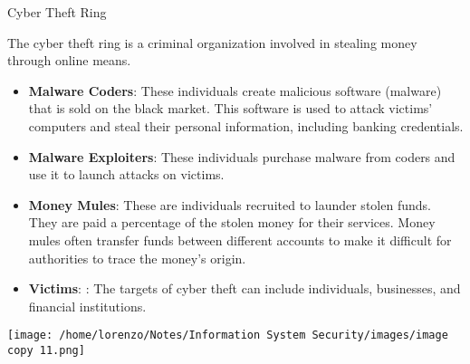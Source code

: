 \begin{quotebox}[colframe=blue!10!white, colback=blue!5!white]{Cyber Theft Ring}
\begin{minipage}{0.5\textwidth}
The cyber theft ring is a criminal organization involved in stealing money through online means. 
\begin{itemize}
    \item \textbf{Malware Coders}: These individuals create malicious software (malware) that is sold on the black market. This software is used to attack victims' computers and steal their personal information, including banking credentials.
    \item \textbf{Malware Exploiters}: These individuals purchase malware from coders and use it to launch attacks on victims.
    \item \textbf{Money Mules}: These are individuals recruited to launder stolen funds. They are paid a percentage of the stolen money for their services. Money mules often transfer funds between different accounts to make it difficult for authorities to trace the money's origin.   
    \item \textbf{Victims}: : The targets of cyber theft can include individuals, businesses, and financial institutions.
\end{itemize} 
\end{minipage} 
\hspace{0.2cm}
\begin{minipage}{0.4\textwidth}
    \centering
    \texttt{[image: /home/lorenzo/Notes/Information System Security/images/image copy 11.png]}
\end{minipage}
\end{quotebox}

